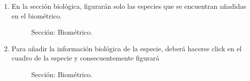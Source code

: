 \documentclass[a4paper,oneside,11pt]{book}
\begin{document}
\begin{itemize}
\begin{enumerate}
\item [] En la sección biológica, figurarán solo las especies que se encuentran añadidas en el biométrico. 


\begin{figure} [!h]
\begin{center}
\caption{Sección: Biométrico.}
\end{center}
\end{figure}

\item [] Para añadir la información biológica de la especie, deberá hacerse click en el cuadro de la especie y consecuentemente figurará

\begin{figure} [!h]
\begin{center}
\caption{Sección: Biométrico.}
\end{center}
\end{figure}


\end{enumerate}
\end{itemize}
\end{document}
